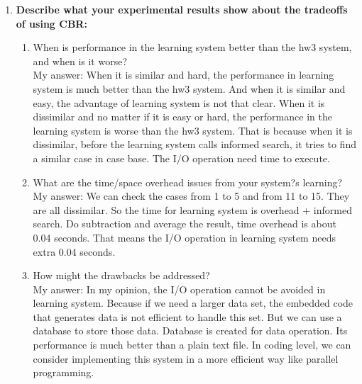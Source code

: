\documentclass[12pt]{article}
\begin{document}
\begin{enumerate}
\item \textbf{Describe what your experimental results show about the tradeoffs of using CBR:}
\begin{enumerate}
\item When is performance in the learning system better than the hw3 system, and when is it worse?\\
My answer: When it is similar and hard, the performance in learning system is much better than the hw3 system. And when it is similar and easy, the advantage of learning system is not that clear. When it is dissimilar and no matter if it is easy or hard, the performance in the learning system is worse than the hw3 system. That is because when it is dissimilar, before the learning system calls informed search, it tries to find a similar case in case base. The I/O operation need time to execute. 
\item What are the time/space overhead issues from your system?s learning?\\
My answer: We can check the cases from 1 to 5 and from 11 to 15. They are all dissimilar. So the time for learning system is overhead + informed search. Do subtraction and average the result, time overhead is about 0.04 seconds. That means the I/O operation in learning system needs extra 0.04 seconds. 
\item How might the drawbacks be addressed? \\
My answer: In my opinion, the I/O operation cannot be avoided in learning system. Because if we need a larger data set, the embedded code that generates data is not efficient to handle this set. But we can use a database to store those data. Database is created for data operation. Its performance is much better than a plain text file. In coding level, we can consider implementing this system in a more efficient way like parallel programming. 
\end{enumerate}
\end{enumerate}
\end{document}
